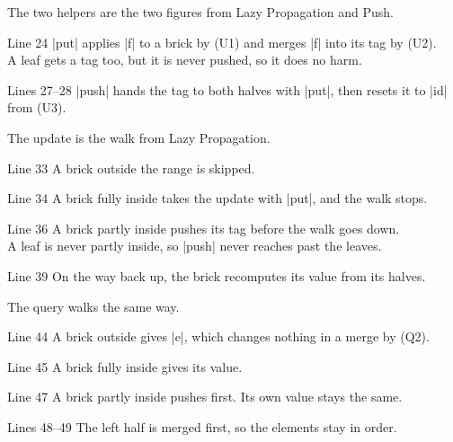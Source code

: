 The two helpers are the two figures from Lazy Propagation and Push.


\begin{notes}
\begin{lines}
\item[Line 24] \code|put| applies \code|f| to a brick by \textup{(U1)} and merges \code|f| into its tag by \textup{(U2)}. \\
A leaf gets a tag too, but it is never pushed, so it does no harm.
\item[Lines 27--28] \code|push| hands the tag to both halves with \code|put|, then resets it to \code|id| from \textup{(U3)}.
\end{lines}
\end{notes}

The update is the walk from Lazy Propagation.


\begin{notes}
\begin{lines}
\item[Line 33] A brick outside the range is skipped.
\item[Line 34] A brick fully inside takes the update with \code|put|, and the walk stops.
\item[Line 36] A brick partly inside pushes its tag before the walk goes down. \\
A leaf is never partly inside, so \code|push| never reaches past the leaves.
\item[Line 39] On the way back up, the brick recomputes its value from its halves.
\end{lines}
\end{notes}

The query walks the same way.


\begin{notes}
\begin{lines}
\item[Line 44] A brick outside gives \code|e|, which changes nothing in a merge by \textup{(Q2)}.
\item[Line 45] A brick fully inside gives its value.
\item[Line 47] A brick partly inside pushes first. Its own value stays the same.
\item[Lines 48--49] The left half is merged first, so the elements stay in order.
\end{lines}
\end{notes}

